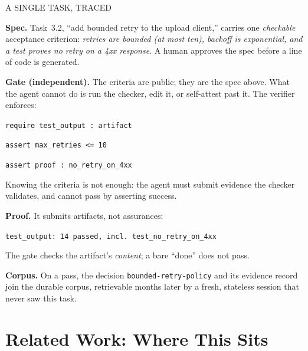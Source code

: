 \documentclass[11pt, a4paper]{article}
\begin{document}
\begin{mdframed}[
  linewidth=0.6pt, linecolor=lightgray, backgroundcolor=white,
  innertopmargin=9pt, innerbottommargin=9pt,
  innerleftmargin=12pt, innerrightmargin=12pt,
  skipabove=12pt, skipbelow=12pt]
{\fontsize{8}{10}\selectfont\color{indigo}A SINGLE TASK, TRACED}\par
\vskip5pt
{\fontsize{9.5}{13.5}\selectfont
\textbf{Spec.}\; Task~3.2, ``add bounded retry to the upload client,'' carries one
\emph{checkable} acceptance criterion: \emph{retries are bounded (at most ten), backoff
is exponential, and a test proves no retry on a 4xx response}. A human approves the spec
before a line of code is generated.\par
\vskip4pt
\textbf{Gate (independent).}\; The criteria are public; they are the spec above. What the
agent cannot do is run the checker, edit it, or self-attest past it. The verifier enforces:\par
\vskip2pt
\hspace*{10pt}\texttt{require test\_output : artifact}\par
\hspace*{10pt}\texttt{assert  max\_retries <= 10}\par
\hspace*{10pt}\texttt{assert  proof : no\_retry\_on\_4xx}\par
\vskip2pt
Knowing the criteria is not enough: the agent must submit evidence the checker validates, and
cannot pass by asserting success.\par
\vskip4pt
\textbf{Proof.}\; It submits artifacts, not assurances:\par
\vskip2pt
\hspace*{10pt}\texttt{test\_output: 14 passed, incl.\ test\_no\_retry\_on\_4xx}\par
\vskip2pt
The gate checks the artifact's \emph{content}; a bare ``done'' does not pass.\par
\vskip4pt
\textbf{Corpus.}\; On a pass, the decision \texttt{bounded-retry-policy} and its evidence
record join the durable corpus, retrievable months later by a fresh, stateless session
that never saw this task.
}
\end{mdframed}

\section{Related Work: Where This Sits}
\end{document}
